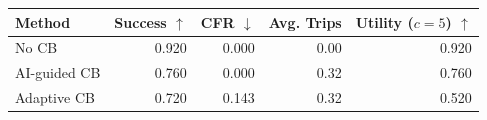 \begin{tabular}{lrrrr}
\toprule
Method & Success $\uparrow$ & CFR $\downarrow$ & Avg. Trips & Utility ($c=5$) $\uparrow$ \\
\midrule
No CB & 0.920 & 0.000 & 0.00 & 0.920 \\
AI-guided CB & 0.760 & 0.000 & 0.32 & 0.760 \\
Adaptive CB & 0.720 & 0.143 & 0.32 & 0.520 \\
\bottomrule
\end{tabular}
